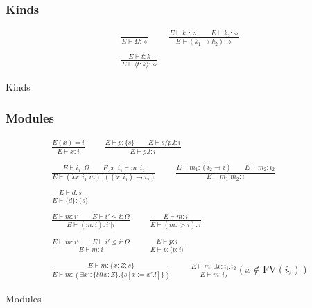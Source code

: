 \documentclass[twoside]{article}
\newcommand{\f}[1]{\mbox{#1}}
\begin{document}
\subsubsection*{Kinds \hfill
{}
}

\begin{displaymath}
\begin{array}{c}
\displaystyle
\frac{
}{
E \vdash \Omega : \diamond
}
\qquad
\frac{
E \vdash k_1 : \diamond
\qquad
E \vdash k_2 : \diamond
}{
E \vdash (k_1\to k_2) : \diamond
}
\\\\\displaystyle
\frac{
E \vdash t : k
}{
E \vdash \langle t:k \rangle : \diamond
}
\end{array}
\end{displaymath}
\begin{center}Kinds\end{center}




\subsubsection*{Modules \hfill
{}
}

\begin{displaymath}
\begin{array}{c}
\displaystyle
\frac{
E(x) = i
}{
E \vdash x : i
}
\qquad
\frac{
E \vdash p : \{s\}
\qquad
E \vdash s/p.l : i
}{
E \vdash p.l : i
}
\\\\\displaystyle
\frac{
E \vdash i_1 : \Omega
\qquad
E,x:i_1 \vdash m : i_2
}{
E \vdash (\lambda x:i_1.m) : ((x:i_1)\to i_2)
}
\qquad
\frac{
E \vdash m_1 : (i_2\to i)
\qquad
E \vdash m_2 : i_2
}{
E \vdash m_1\;m_2 : i
}
\\\\\displaystyle
\frac{
E \vdash d : s
}{
E \vdash \{d\} : \{s\}
}
\\\\\displaystyle
\frac{
E \vdash m : i'
\qquad
E \vdash i' \leq i : \Omega
}{
E \vdash (m : i) : i'|i
}
\qquad
\frac{
E \vdash m : i
}{
E \vdash (m :> i) : i
}
\\\\\displaystyle
\frac{
E \vdash m : i'
\qquad
E \vdash i' \leq i : \Omega
}{
E \vdash m : i
}
\qquad
\frac{
E \vdash p : i
}{
E \vdash p : \langle p:i\rangle
}
\\\\\displaystyle
\frac{
E \vdash m : \{x:Z;s\}
}{
E \vdash m : (\exists x':\{l@x:Z\}.\{s[x:=x'.l]\})
}
\qquad
\frac{
E \vdash m : \exists x:i_1.i_2
}{
E \vdash m : i_2
}(x \notin \f{FV}(i_2))
\end{array}
\end{displaymath}
\begin{center}Modules\end{center}
\end{document}

